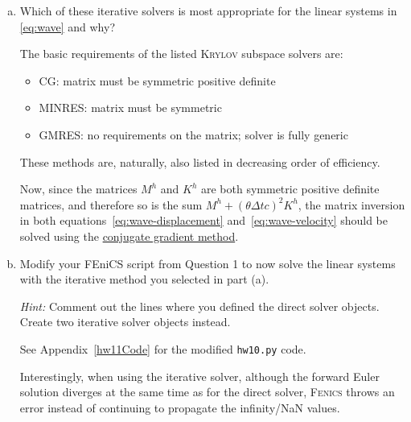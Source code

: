 \begin{enumerate}[(a)]
\item Which of these iterative solvers is most appropriate for the linear systems in \eqref{eq:wave} and why?

\vspace{0.25cm}
\begin{solution}
The basic requirements of the listed \textsc{Krylov} subspace solvers are:
\begin{itemize}
\item \textsc{CG:} matrix must be symmetric positive definite
\item \textsc{MINRES:} matrix must be symmetric
\item \textsc{GMRES:} no requirements on the matrix; solver is fully generic
\end{itemize}
These methods are, naturally, also listed in decreasing order of efficiency. 

Now, since the matrices $M^h$ and $K^h$ are both symmetric positive definite matrices, and therefore so is the sum $M^h + \left(\theta \Delta t c\right)^2 K^h$, the matrix inversion in both equations~\ref{eq:wave-displacement} and~\ref{eq:wave-velocity} should be solved using the \underline{conjugate gradient method}.
\end{solution}

\vspace{0.25cm}
\item Modify your \textsf{FEniCS} script from Question 1 to now solve the linear systems with the iterative method you selected in part (a).

\emph{Hint:} Comment out the lines where you defined the direct solver objects. Create two iterative solver objects instead.

\vspace{0.25cm}
\begin{solution}
See Appendix~\ref{hw11Code} for the modified \texttt{hw10.py} code.

Interestingly, when using the iterative solver, although the forward Euler solution diverges at the same time as for the direct solver, \textsc{Fenics} throws an error instead of continuing to propagate the infinity/NaN values.


\end{solution}
\end{enumerate}

